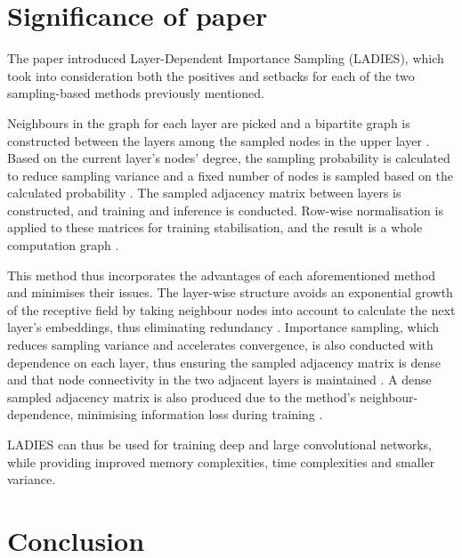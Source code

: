 \chapter{Significance of paper}
The paper introduced Layer-Dependent Importance Sampling (LADIES), which took into consideration both the positives and setbacks for each of the two sampling-based methods previously mentioned.

Neighbours in the graph for each layer are picked and a bipartite graph is constructed between the layers among the sampled nodes in the upper layer \cite{assigned_paper_zou2019layer}. Based on the current layer's nodes' degree, the sampling probability is calculated to reduce sampling variance and a fixed number of nodes is sampled based on the calculated probability \cite{assigned_paper_zou2019layer}. The sampled adjacency matrix between layers is constructed, and training and inference is conducted. Row-wise normalisation is applied to these matrices for training stabilisation, and the result is a whole computation graph \cite{assigned_paper_zou2019layer}.

This method thus incorporates the advantages of each aforementioned method and minimises their issues. The layer-wise structure avoids an exponential growth of the receptive field by taking neighbour nodes into account to calculate the next layer's embeddings, thus eliminating redundancy \cite{assigned_paper_zou2019layer}. Importance sampling, which reduces sampling variance and accelerates convergence, is also conducted with dependence on each layer, thus ensuring the sampled adjacency matrix is dense and that node connectivity in the two adjacent layers is maintained \cite{assigned_paper_zou2019layer}. A dense sampled adjacency matrix is also produced due to the method's neighbour-dependence, minimising information loss during training \cite{assigned_paper_zou2019layer}.

LADIES can thus be used for training deep and large convolutional networks, while providing improved memory complexities, time complexities and smaller variance.
\chapter{Conclusion}